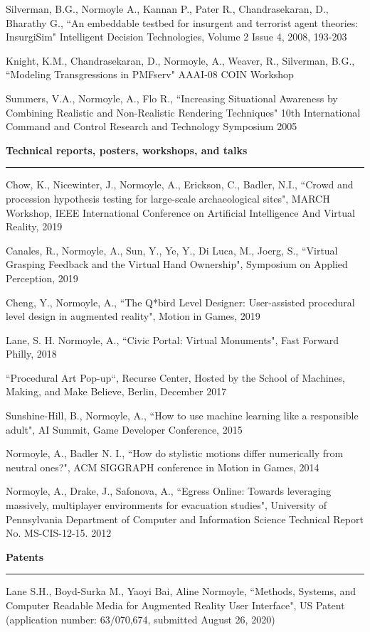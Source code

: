Silverman, B.G., Normoyle A., Kannan P., Pater R., Chandrasekaran, D., Bharathy G., ``An embeddable testbed for insurgent and terrorist agent theories: InsurgiSim" Intelligent Decision Technologies, Volume 2 Issue 4, 2008, 193-203

Knight, K.M., Chandrasekaran, D., Normoyle, A., Weaver, R., Silverman, B.G., ``Modeling Transgressions in PMFserv" AAAI-08 COIN Workshop

Summers, V.A., Normoyle, A., Flo R., ``Increasing Situational Awareness by Combining Realistic and Non-Realistic Rendering Techniques" 10th International Command and Control Research and Technology Symposium 2005

\medskip
\medskip

{\Large {\bf  Technical reports, posters, workshops, and talks}}
\vspace{0.1cm}
\hrule
\medskip

Chow, K., Nicewinter, J., Normoyle, A., Erickson, C., Badler, N.I., ``Crowd and procession hypothesis testing for large-scale archaeological sites", MARCH Workshop, IEEE International Conference on Artificial Intelligence And Virtual Reality, 2019

Canales, R., Normoyle, A., Sun, Y., Ye, Y., Di Luca, M., Joerg, S., ``Virtual Grasping Feedback and the Virtual Hand Ownership", Symposium on Applied Perception, 2019 

Cheng, Y., Normoyle, A., ``The Q*bird Level Designer: User-assisted procedural level design in augmented reality", Motion in Games, 2019 

Lane, S. H. Normoyle, A., ``Civic Portal: Virtual Monuments", Fast Forward Philly, 2018

``Procedural Art Pop-up``, Recurse Center, Hosted by the School of Machines, Making, and Make Believe, Berlin, December 2017 

Sunshine-Hill, B., Normoyle, A., ``How to use machine learning like a responsible adult", AI Summit, Game Developer Conference, 2015

Normoyle, A., Badler N. I., ``How do stylistic motions differ numerically from neutral ones?", ACM SIGGRAPH conference in Motion in Games, 2014

Normoyle, A., Drake, J., Safonova, A., ``Egress Online: Towards leveraging massively, multiplayer environments for evacuation studies", University of Pennsylvania Department of Computer and Information Science Technical Report No. MS-CIS-12-15. 2012

\medskip
\medskip

{\Large {\bf Patents}}
\vspace{0.1cm}
\hrule
\medskip

Lane S.H., Boyd-Surka M., Yaoyi Bai, Aline Normoyle, ``Methods, Systems, and Computer Readable Media for Augmented Reality User Interface", US Patent (application number: 63/070,674, submitted August 26, 2020)


